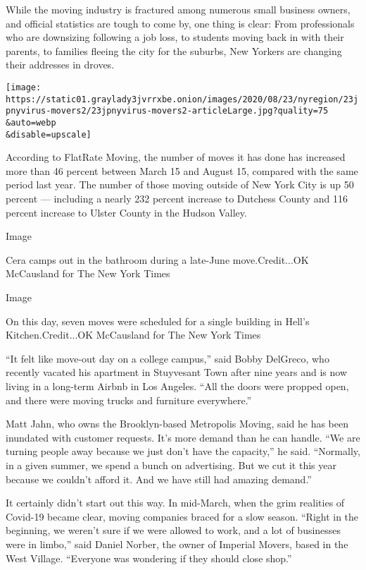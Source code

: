While the moving industry is fractured among numerous small business
owners, and official statistics are tough to come by, one thing is
clear: From professionals who are downsizing following a job loss, to
students moving back in with their parents, to families fleeing the city
for the suburbs, New Yorkers are changing their addresses in droves.

\texttt{[image: https://static01.graylady3jvrrxbe.onion/images/2020/08/23/nyregion/23jpnyvirus-movers2/23jpnyvirus-movers2-articleLarge.jpg?quality=75\\\&auto=webp\\\&disable=upscale]}

According to FlatRate Moving, the number of moves it has done has
increased more than 46 percent between March 15 and August 15, compared
with the same period last year. The number of those moving outside of
New York City is up 50 percent --- including a nearly 232 percent
increase to Dutchess County and 116 percent increase to Ulster County in
the Hudson Valley.

Image

Cera camps out in the bathroom during a late-June move.Credit...OK
McCausland for The New York Times

Image

On this day, seven moves were scheduled for a single building in Hell's
Kitchen.Credit...OK McCausland for The New York Times

``It felt like move-out day on a college campus,'' said Bobby DelGreco,
who recently vacated his apartment in Stuyvesant Town after nine years
and is now living in a long-term Airbnb in Los Angeles. ``All the doors
were propped open, and there were moving trucks and furniture
everywhere.''

Matt Jahn, who owns the Brooklyn-based Metropolis Moving, said he has
been inundated with customer requests. It's more demand than he can
handle. ``We are turning people away because we just don't have the
capacity,'' he said. ``Normally, in a given summer, we spend a bunch on
advertising. But we cut it this year because we couldn't afford it. And
we have still had amazing demand.''

It certainly didn't start out this way. In mid-March, when the grim
realities of Covid-19 became clear, moving companies braced for a slow
season. ``Right in the beginning, we weren't sure if we were allowed to
work, and a lot of businesses were in limbo,'' said Daniel Norber, the
owner of Imperial Movers, based in the West Village. ``Everyone was
wondering if they should close shop.''

